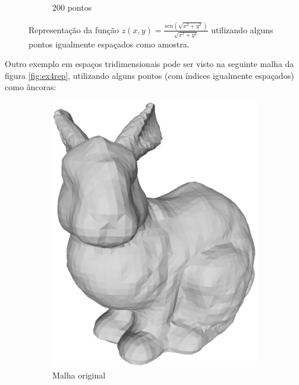 \begin{figure}[H]
\begin{subfigure}[b]{0.48\textwidth}
		\caption{200 pontos}
		\label{fig:ex32}
	\end{subfigure}
	\caption{Representação da função $z(x, y) = \frac{sen (\sqrt{x^2 + y^2})}{\sqrt{x^2 + y^2}}$ utilizando alguns pontos igualmente espaçados como amostra.}
	\label{fig:ex3rep}
\end{figure}

Outro exemplo em espaços tridimensionais pode ser visto na seguinte malha da figura \ref{fig:ex4rep}, utilizando alguns pontos (com índices igualmente espaçados) como âncoras:

\begin{figure}[H]
	\centering
	\begin{subfigure}[b]{0.47\textwidth}
		\centering
		\includegraphics[width=\textwidth]{imagens/cap4/bunny_all.eps}
		\caption{Malha original}
		\label{fig:ex41}
	\end{subfigure}
	\hfill
	\begin{subfigure}[b]{0.47\textwidth}
	\centering

\end{subfigure}
\end{figure}

